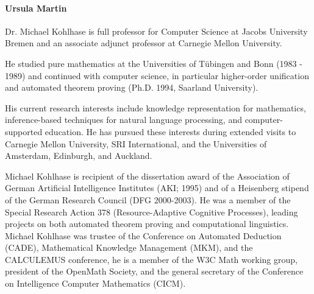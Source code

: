 \paragraph{Ursula Martin}

%

%


Dr. Michael Kohlhase is full professor for Computer Science at Jacobs University Bremen
and an associate adjunct professor at Carnegie Mellon University.

He studied pure mathematics at the Universities of T\"ubingen and Bonn (1983 - 1989) and
continued with computer science, in particular higher-order unification and automated
theorem proving (Ph.D. 1994, Saarland University). 

His current research interests include knowledge representation for mathematics,
inference-based techniques for natural language processing, and computer-supported
education. He has pursued these interests during extended visits to Carnegie Mellon
University, SRI International, and the Universities of Amsterdam, Edinburgh, and Auckland.

Michael Kohlhase is recipient of the dissertation award of the Association of German
Artificial Intelligence Institutes (AKI; 1995) and of a Heisenberg stipend of the German
Research Council (DFG 2000-2003). He was a member of the Special Research Action 378
(Resource-Adaptive Cognitive Processes), leading projects on both automated theorem
proving and computational linguistics. Michael Kohlhase was trustee of the Conference on
Automated Deduction (CADE), Mathematical Knowledge Management (MKM), and the CALCULEMUS
conference, he is a member of the W3C Math working group, president of the OpenMath
Society, and the general secretary of the Conference on Intelligence Computer Mathematics
(CICM).



 


